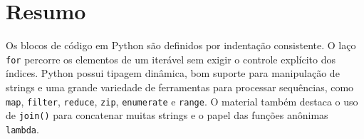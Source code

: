 \documentclass[11pt,a4paper]{article}
\begin{document}
\section{Resumo}
Os blocos de código em Python são definidos por indentação consistente. O laço \texttt{for} percorre os elementos de um iterável sem exigir o controle explícito dos índices. Python possui tipagem dinâmica, bom suporte para manipulação de strings e uma grande variedade de ferramentas para processar sequências, como \texttt{map}, \texttt{filter}, \texttt{reduce}, \texttt{zip}, \texttt{enumerate} e \texttt{range}. O material também destaca o uso de \texttt{join()} para concatenar muitas strings e o papel das funções anônimas \texttt{lambda}.
\end{document}
